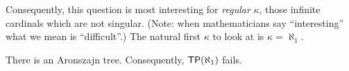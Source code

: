 \documentclass[10pt]{amsart}
\newcommand\TP{\axiom{TP}}
\begin{document}
Consequently, this question is most interesting for \emph{regular} $\kappa$, those infinite cardinals which are not singular. (Note: when mathematicians say ``interesting'' what we mean is ``difficult''.) The natural first $\kappa$ to look at is $\kappa = \aleph_1$.

\begin{theorem}[Aronszajn, 1934]
There is an Aronszajn tree. Consequently, $\TP(\aleph_1)$ fails.
\end{theorem}







\end{document}
